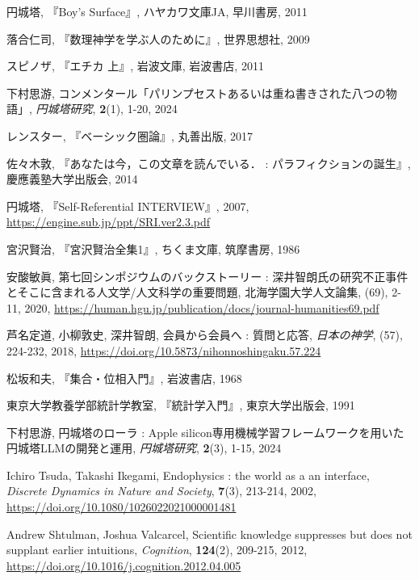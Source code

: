 \documentclass[10pt, a5paper, twoside]{jsarticle}
\theoremstyle{definition}
\begin{document}
	\begin{thebibliography}{99}

		 円城塔, 『Boy's Surface』, ハヤカワ文庫JA, 早川書房, 2011

         落合仁司, 『数理神学を学ぶ人のために』, 世界思想社, 2009

         スピノザ, 『エチカ 上』, 岩波文庫, 岩波書店, 2011

         下村思游, コンメンタール「パリンプセストあるいは重ね書きされた八つの物語」, \textit{円城塔研究}, \textbf{2}(1), 1-20, 2024

         レンスター, 『ベーシック圏論』, 丸善出版, 2017

         佐々木敦, 『あなたは今，この文章を読んでいる． : パラフィクションの誕生』, 慶應義塾大学出版会, 2014

         円城塔, 『Self-Referential INTERVIEW』, 2007, \url{https://engine.sub.jp/ppt/SRI.ver2.3.pdf}

         宮沢賢治, 『宮沢賢治全集1』, ちくま文庫, 筑摩書房, 1986

         安酸敏眞, 第七回シンポジウムのバックストーリー : 深井智朗氏の研究不正事件とそこに含まれる人文学/人文科学の重要問題, 北海学園大学人文論集, (69), 2-11, 2020, \url{https://human.hgu.jp/publication/docs/journal-humanities69.pdf}

         芦名定道, 小柳敦史, 深井智朗, 会員から会員へ : 質問と応答, \textit{日本の神学}, (57), 224-232, 2018, \url{https://doi.org/10.5873/nihonnoshingaku.57.224}

         松坂和夫, 『集合・位相入門』, 岩波書店, 1968

         東京大学教養学部統計学教室, 『統計学入門』, 東京大学出版会, 1991

         下村思游, 円城塔のローラ : Apple silicon専用機械学習フレームワークを用いた円城塔LLMの開発と運用, \textit{円城塔研究}, \textbf{2}(3), 1-15, 2024

         Ichiro Tsuda, Takashi Ikegami, Endophysics : the world as a an interface, \textit{Discrete Dynamics in Nature and Society}, \textbf{7}(3), 213-214, 2002, \url{https://doi.org/10.1080/1026022021000001481}

         Andrew Shtulman, Joshua Valcarcel, Scientific knowledge suppresses but does not supplant earlier intuitions, \textit{Cognition}, \textbf{124}(2), 209-215, 2012, \url{https://doi.org/10.1016/j.cognition.2012.04.005}


\end{thebibliography}
\end{document}
